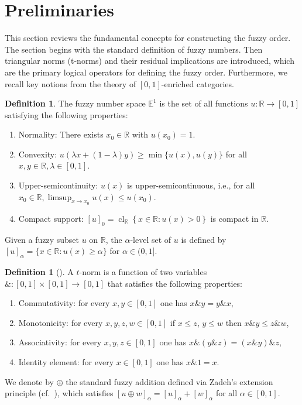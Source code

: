 \documentclass[preprint,3p,times]{elsarticle}
\theoremstyle{plain}
\theoremstyle{definition}
\newtheorem{definition}[thm]{Definition}
\numberwithin{equation}{section}
\begin{document}
\section{Preliminaries} 
This section reviews the fundamental concepts for constructing the fuzzy order. The section begins with the standard definition of fuzzy numbers. Then triangular norms (t-norms) and their residual implications are introduced, which are the primary logical operators for defining the fuzzy order. Furthermore, we recall key notions from the theory of $[0,1]$-enriched categories. 
\begin{definition}
The fuzzy number space \( \mathbb{E}^1 \) is the set of all functions \( u :\mathbb{R}\to [0,1]\) satisfying the following properties:
\begin{enumerate}[label={\rm(\arabic*)}]
  \item Normality: There exists \( x_0 \in \mathbb{R} \) with \( u(x_0) = 1 \).
  \item Convexity: \( u(\lambda x + (1-\lambda)y) \geq \min \{u(x), u(y)\} \) for all \( x, y \in \mathbb{R}, \lambda \in [0,1] \).
  \item Upper-semicontinuity: \( u(x) \) is upper-semicontinuous, i.e.,  for all  \(x_0\in \mathbb{R}, \limsup_{x \to x_0} u(x) \le u(x_0).\) 
  \item Compact support: \([u]_0=\operatorname{cl}_{\mathbb{R}} \left\{x \in \mathbb{R} : u(x) > 0\right\} \) is compact in \( \mathbb{R} \).
\end{enumerate}
\end{definition} 
Given a fuzzy subset \( u \) on \( \mathbb{R} \), the \( \alpha \)-level set of \( u \) is defined by \([u]_ \alpha  = \{x \in \mathbb{R} : u(x) \geq  \alpha \} \) for \(  \alpha  \in (0, 1] \). 


\begin{definition}[\cite{Alsina2006}]
    A \( t \)-norm is a function of two variables \( \&: [0,1] \times [0,1] \to [0,1] \) that satisfies the following properties:
\begin{enumerate}[label={\rm(\arabic*)}]
    \item Commutativity: for every \( x, y \in [0,1] \) one has \( x \&y = y\&x \),
    \item Monotonicity: for every \( x, y, z, w \in [0,1] \) if \( x \leq z \), \( y \leq w \) then  $x \& y \leq z\& w$,
    \item Associativity: for every \( x, y, z \in [0,1] \) one has \( x\& (y\& z) = (x\& y)\& z \),
    \item Identity element: for every \( x \in [0,1] \) one has \( x\& 1 = x \).
\end{enumerate}
\end{definition}
We denote by $\oplus$ the standard fuzzy addition defined via Zadeh's extension principle
(cf.\ \cite{Klir1995FuzzySA}), which satisfies $[u\oplus w]_\alpha=[u]_\alpha+[w]_\alpha$ for all
$\alpha\in[0,1]$.
\end{document}
